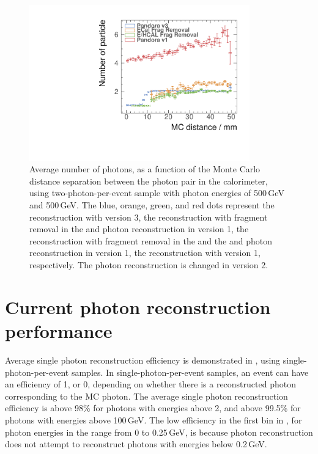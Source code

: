 \begin{figure}[tbph]
\centering
\includegraphics[width=0.85\textwidth]{photon/DoubleCompareAlg3.pdf}
\caption[Average number of photons, as a function of the MC distance separation for different algorithms combinations.]
{Average number of photons, as a function of the Monte Carlo distance separation between the photon pair in the calorimeter, using two-photon-per-event sample with photon energies of  500\,GeV and 500\,GeV. The blue, orange, green, and red dots represent the reconstruction with \pandora version 3, the reconstruction with fragment removal in the \ECAL and photon reconstruction in  \pandora version 1,  the reconstruction with fragment removal in the \ECAL and the \HCAL and photon reconstruction in  \pandora version 1, the reconstruction with \pandora version 1, respectively. The photon reconstruction is changed in \pandora version 2.}
\label{fig:photonDoubleCompareAlgs}
\end{figure}

\section{Current photon reconstruction performance}


Average single photon reconstruction  efficiency is demonstrated in , using single-photon-per-event samples. In single-photon-per-event samples, an event can have an efficiency of 1, or 0, depending on whether there is a reconstructed photon  corresponding to the MC photon. The average single photon reconstruction efficiency is above 98\% for photons with energies above 2\GeV, and above 99.5\% for photons  with energies  above 100\,GeV.  The low efficiency in the first bin in , for photon energies in the range from 0 to 0.25\,GeV, is because photon reconstruction does not attempt to reconstruct photons with energies below 0.2\,GeV.

